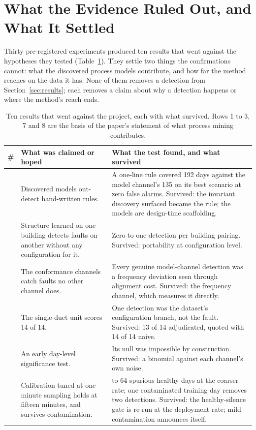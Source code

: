 \documentclass[11pt,letterpaper]{article}
\begin{document}
\section{What the Evidence Ruled Out, and What It Settled}
\label{sec:falsified}
Thirty pre-registered experiments produced ten results that went against the hypotheses they tested (Table~\ref{tab:refuted}). They settle two things the confirmations cannot: what the discovered process models contribute, and how far the method reaches on the data it has. None of them removes a detection from Section~\ref{sec:results}; each removes a claim about why a detection happens or where the method's reach ends.

\begin{table}[htbp]
\centering
\caption{Ten results that went against the project, each with what survived. Rows 1 to 3, 7 and 8 are the basis of the paper's statement of what process mining contributes.}
\label{tab:refuted}
\small\setlength{\tabcolsep}{4pt}\renewcommand{\arraystretch}{1.1}
\begin{tabular}{@{}>{\raggedright\arraybackslash}p{}>{\raggedright\arraybackslash}p{}>{\raggedright\arraybackslash}p{}@{}}
\hline
\# & What was claimed or hoped & What the test found, and what survived \\
\hline
1 & Discovered models out-detect hand-written rules. & A one-line rule covered 192 days against the model channel's 135 on its best scenario at zero false alarms. Survived: the invariant discovery surfaced became the rule; the models are design-time scaffolding. \\
2 & Structure learned on one building detects faults on another without any configuration for it. & Zero to one detection per building pairing. Survived: portability at configuration level. \\
3 & The conformance channels catch faults no other channel does. & Every genuine model-channel detection was a frequency deviation seen through alignment cost. Survived: the frequency channel, which measures it directly. \\
4 & The single-duct unit scores 14 of 14. & One detection was the dataset's configuration branch, not the fault. Survived: 13 of 14 adjudicated, quoted with 14 of 14 naive. \\
5 & An early day-level significance test. & Its null was impossible by construction. Survived: a binomial against each channel's own noise. \\
6 & Calibration tuned at one-minute sampling holds at fifteen minutes, and survives contamination. & 28 to 64 spurious healthy days at the coarser rate; one contaminated training day removes two detections. Survived: the healthy-silence gate is re-run at the deployment rate; mild contamination announces itself. \\

\end{tabular}
\end{table}
\end{document}
